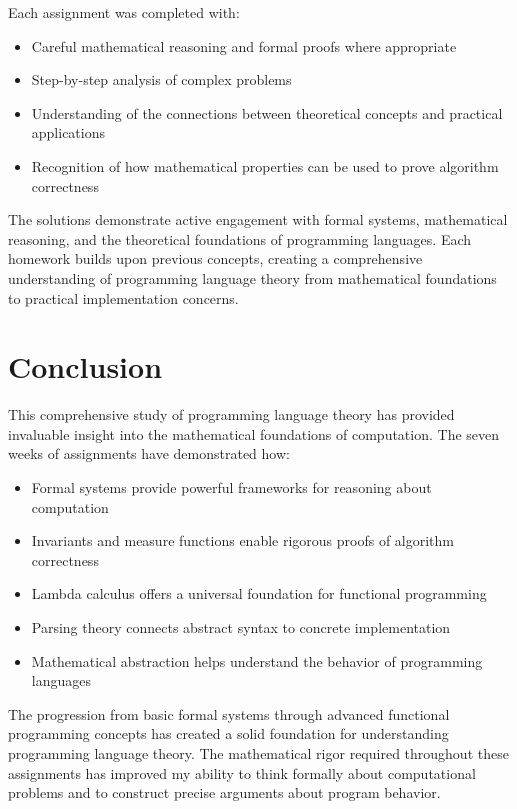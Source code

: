 \documentclass{article}
\theoremstyle{plain}
\theoremstyle{definition}
\theoremstyle{remark}
\begin{document}
Each assignment was completed with:
\begin{itemize}
\item Careful mathematical reasoning and formal proofs where appropriate
\item Step-by-step analysis of complex problems
\item Understanding of the connections between theoretical concepts and practical applications
\item Recognition of how mathematical properties can be used to prove algorithm correctness
\end{itemize}

The solutions demonstrate active engagement with formal systems, mathematical reasoning, and the theoretical foundations of programming languages. Each homework builds upon previous concepts, creating a comprehensive understanding of programming language theory from mathematical foundations to practical implementation concerns.

\section{Conclusion}\label{conclusion}

This comprehensive study of programming language theory has provided invaluable insight into the mathematical foundations of computation. The seven weeks of assignments have demonstrated how:

\begin{itemize}
\item Formal systems provide powerful frameworks for reasoning about computation
\item Invariants and measure functions enable rigorous proofs of algorithm correctness
\item Lambda calculus offers a universal foundation for functional programming
\item Parsing theory connects abstract syntax to concrete implementation
\item Mathematical abstraction helps understand the behavior of programming languages
\end{itemize}

The progression from basic formal systems through advanced functional programming concepts has created a solid foundation for understanding programming language theory. The mathematical rigor required throughout these assignments has improved my ability to think formally about computational problems and to construct precise arguments about program behavior.
\end{document}
